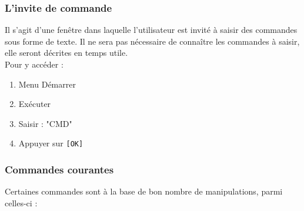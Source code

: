 \documentclass[a4paper]{article}
\begin{document}
\subsubsection{L'invite de commande}
Il s'agit d'une fenêtre dans laquelle l'utilisateur est invité à saisir des commandes sous forme de texte.
Il ne sera pas nécessaire de connaître les commandes à saisir, elle seront décrites en temps utile.\\
Pour y accéder :
\begin{enumerate}
	\item Menu Démarrer
	\item Exécuter
	\item Saisir : "CMD"
	\item Appuyer sur \verb![OK]!
\end{enumerate}
\subsubsection{Commandes courantes}
Certaines commandes sont à la base de bon nombre de manipulations, parmi celles-ci : 
\end{document}
